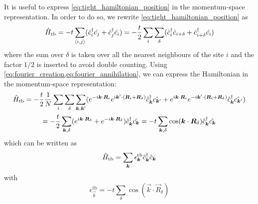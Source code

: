 It is useful to express \cref{eq:tight_hamiltonian_position} in the momentum-space representation. In order to do so, we rewrite \cref{eq:tight_hamiltonian_position} as
\begin{equation}
    \hat{H}_\text{tb} = -t \sum_{\langle i,j \rangle} (\hat{c}^\dagger_i\hat{c_j} +  \hat{c}^\dagger_j\hat{c_i})
    = -\frac{t}{2} \sum_{i} \sum_\delta (\hat{c}^\dagger_i\hat{c}_{i+\delta} +  \hat{c}^\dagger_{i+\delta}\hat{c_i})
\end{equation}
where the sum over $\delta$ is taken over all the nearest neighbours of the site $i$ and the factor $1/2$ is inserted to avoid double counting. Using \cref{eq:fourier_creation,eq:fourier_annihilation}, we can express the Hamiltonian in the momentum-space representation:
\begin{multline}
    \hat{H}_\text{tb}
    = -\frac{t}{2} \frac{1}{N} \sum_{i} \sum_\delta \sum_{\mathbf{\boldsymbol{k}}, \mathbf{\boldsymbol{k}}'}
    (e^{-i\mathbf{\boldsymbol{k}}\cdot\mathbf{\boldsymbol{R}}_i} e^{i\mathbf{\boldsymbol{k}}'\cdot(\mathbf{\boldsymbol{R}}_i+\mathbf{\boldsymbol{R}}_\delta)} \hat{c}^\dagger_{\mathbf{\boldsymbol{k}}} \hat{c_{\mathbf{\boldsymbol{k}}'}} +
    e^{i\mathbf{\boldsymbol{k}}\cdot\mathbf{\boldsymbol{R}}_i} e^{-i\mathbf{\boldsymbol{k}}'\cdot(\mathbf{\boldsymbol{R}}_i+\mathbf{\boldsymbol{R}}_\delta)} \hat{c}^\dagger_{\mathbf{\boldsymbol{k}}} \hat{c_{\mathbf{\boldsymbol{k}}'}}) \\
    = -\frac{t}{2} \sum_{\mathbf{\boldsymbol{k}},\delta} (e^{i\mathbf{\boldsymbol{k}}\cdot\mathbf{\boldsymbol{R}}_\delta}+e^{-i\mathbf{\boldsymbol{k}}\cdot\mathbf{\boldsymbol{R}}_\delta})  \hat{c}^\dagger_{\mathbf{\boldsymbol{k}}} \hat{c_{\mathbf{\boldsymbol{k}}}}
    = -t \sum_{\mathbf{\boldsymbol{k}},\delta} \cos(\mathbf{\boldsymbol{k}}\cdot\mathbf{\boldsymbol{R}}_\delta) \hat{c}^\dagger_{\mathbf{\boldsymbol{k}}} \hat{c_{\mathbf{\boldsymbol{k}}}}
\end{multline}
which can be written as
\begin{equation} \label{eq:tight_hamiltonian_momentum}
    \hat{H}_\text{tb} = \sum_{\mathbf{\boldsymbol{k}}} \epsilon_{\mathbf{\boldsymbol{k}}}^\text{tb} \hat{c}^\dagger_{\mathbf{\boldsymbol{k}}}\hat{c}_{\mathbf{\boldsymbol{k}}}
\end{equation}
with
\begin{equation}
    \epsilon_\vec{k}^\text{tb} = -t \sum_{    \delta} \cos(\vec{k}\cdot\vec{R}_\delta)
\end{equation}

